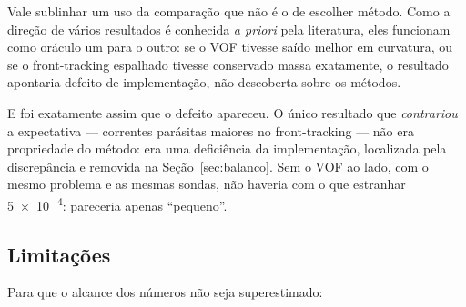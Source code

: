 Vale sublinhar um uso da compara\c{c}\~ao que n\~ao \'e o de escolher m\'etodo.
Como a dire\c{c}\~ao de v\'arios resultados \'e conhecida \emph{a priori} pela
literatura, eles funcionam como or\'aculo um para o outro: se o VOF tivesse
sa\'ido melhor em curvatura, ou se o front-tracking espalhado tivesse conservado
massa exatamente, o resultado apontaria defeito de implementa\c{c}\~ao, n\~ao
descoberta sobre os m\'etodos.

E foi exatamente assim que o defeito apareceu. O \'unico resultado que
\emph{contrariou} a expectativa --- correntes par\'asitas maiores no
front-tracking --- n\~ao era propriedade do m\'etodo: era uma deficiência da
implementa\c{c}\~ao, localizada pela discrep\^ancia e removida na
Se\c{c}\~ao~\ref{sec:balanco}. Sem o VOF ao lado, com o mesmo problema e as
mesmas sondas, n\~ao haveria com o que estranhar \num{5e-4}: pareceria apenas
``pequeno''.

\subsection{Limita\c{c}\~oes}

Para que o alcance dos n\'umeros n\~ao seja superestimado:


